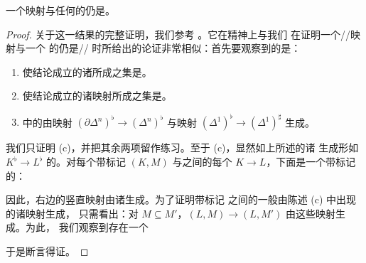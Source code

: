 \begin{lemma}\label{lem:pushout-product-marked-left-anodyne}
一个\trMarkedLeftAnodyne{}映射与任何\trMonomorphism{}的\trPushoutProduct{}仍是\trMarkedLeftAnodyne。
\end{lemma}

\begin{proof}
关于这一结果的完整证明，我们参考 \cite[Prop.~3.1.2.3.]{Lur09}。它在精神上与我们
在证明一个\trLeftAnodyne{}/\trRightAnodyne{}/\trInnerAnodyne{}映射与一个%
\trMonomorphism{}的\trPushoutProduct{}仍是\trLeftAnodyne{}/\trRightAnodyne{}/%
\trInnerAnodyne{}时所给出的论证非常相似：首先要观察到的是：
\begin{enumerate}[label=(\alph*)]
  \item 使结论成立的诸\trMonomorphism{}所成之集是\trSaturated{}。
  \item 使结论成立的诸\trMarkedAnodyne{}映射所成之集是\trSaturated{}。
  \item \trMarkedSimplicialSet{}中的\trMonomorphism{}由映射 $(\partial\Delta^n)^\flat \to (\Delta^n)^\flat$ 与映射 $(\Delta^1)^\flat \to (\Delta^1)^\sharp$ 生成。
\end{enumerate}
我们只证明 (c)，并把其余两项留作练习。至于 (c)，显然如上所述的诸\trBoundaryInclusion{}%
生成形如 $K^\flat \to L^\flat$ 的\trMonomorphism{}。对每个带标记%
\trSimplicialSet{} $(K, M)$ 与\trSimplicialSet{}之间的每个\trMonomorphism{}%
$K \to L$，下面是一个带标记\trSimplicialSet{}的\trPushout{}：
\begin{center}
\end{center}
因此，右边的竖直映射由诸\trBoundaryInclusion{}生成。为了证明带标记%
\trSimplicialSet{}之间的一般\trMonomorphism{}由陈述 (c) 中出现的诸映射生成，
只需看出：对 $M \subseteq M'$，$(L, M) \to (L, M')$ 由这些映射生成。为此，
我们观察到存在一个\trPushout{}%
\begin{center}
\end{center}
于是断言得证。


\end{proof}
